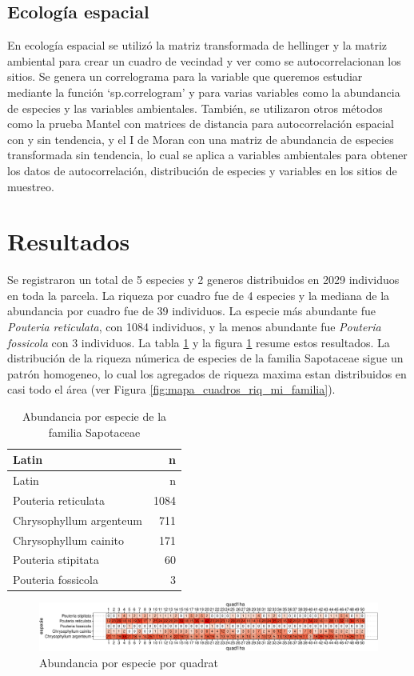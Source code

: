 \documentclass[11pt,]{article}
\begin{document}
\subsection{Ecología espacial}\label{ecologuxeda-espacial}

En ecología espacial se utilizó la matriz transformada de hellinger y la
matriz ambiental para crear un cuadro de vecindad y ver como se
autocorrelacionan los sitios. Se genera un correlograma para la variable
que queremos estudiar mediante la función `sp.correlogram' y para varias
variables como la abundancia de especies y las variables ambientales.
También, se utilizaron otros métodos como la prueba Mantel con matrices
de distancia para autocorrelación espacial con y sin tendencia, y el I
de Moran con una matriz de abundancia de especies transformada sin
tendencia, lo cual se aplica a variables ambientales para obtener los
datos de autocorrelación, distribución de especies y variables en los
sitios de muestreo.

\section{Resultados}\label{resultados}

Se registraron un total de 5 especies y 2 generos distribuidos en 2029
individuos en toda la parcela. La riqueza por cuadro fue de 4 especies y
la mediana de la abundancia por cuadro fue de 39 individuos. La especie
más abundante fue \emph{Pouteria reticulata}, con 1084 individuos, y la
menos abundante fue \emph{Pouteria fossicola} con 3 individuos. La tabla
\ref{tab:abun_sp} y la figura \ref{fig:abun_sp_q} resume estos
resultados. La distribución de la riqueza númerica de especies de la
familia Sapotaceae sigue un patrón homogeneo, lo cual los agregados de
riqueza maxima estan distribuidos en casi todo el área (ver Figura
\ref{fig:mapa_cuadros_riq_mi_familia}).

\begin{longtable}[]{@{}lr@{}}
\caption{\label{tab:abun_sp}Abundancia por especie de la familia
Sapotaceae}\tabularnewline
\toprule
Latin & n\tabularnewline
\midrule
\endfirsthead
\toprule
Latin & n\tabularnewline
\midrule
\endhead
Pouteria reticulata & 1084\tabularnewline
Chrysophyllum argenteum & 711\tabularnewline
Chrysophyllum cainito & 171\tabularnewline
Pouteria stipitata & 60\tabularnewline
Pouteria fossicola & 3\tabularnewline
\bottomrule
\end{longtable}

\begin{figure}
\centering
\includegraphics{manuscrito_files/figure-latex/unnamed-chunk-3-1.pdf}
\caption{\label{fig:abun_sp_q}Abundancia por especie por quadrat}
\end{figure}
\end{document}

